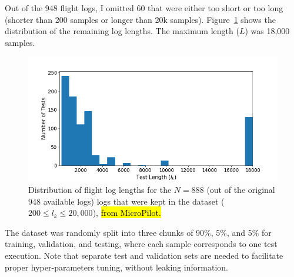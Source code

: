 Out of the 948 flight logs, I omitted 60 that were either too short or too long (shorter than 200 samples or longer than 20k samples). Figure~\ref{fig:test_lengths} shows the distribution of the remaining log lengths. The maximum length ($L$) was 18,000 samples.

\begin{figure}
    \centering
    \includegraphics[width=\columnwidth]{ASE_files/test_lengths.png}
    \caption{Distribution of flight log lengths for the $N=888$ (out of the original 948 available logs) logs that were kept in the dataset ($200 \leq l_k \leq 20,000$), \hl{from MicroPilot.}}
    \label{fig:test_lengths}
\end{figure}

The dataset was randomly split into three chunks of 90\%, 5\%, and 5\% for training, validation, and testing, where each sample corresponds to one test execution. Note that separate test and validation sets are needed to facilitate proper hyper-parameters tuning, without leaking information. 

